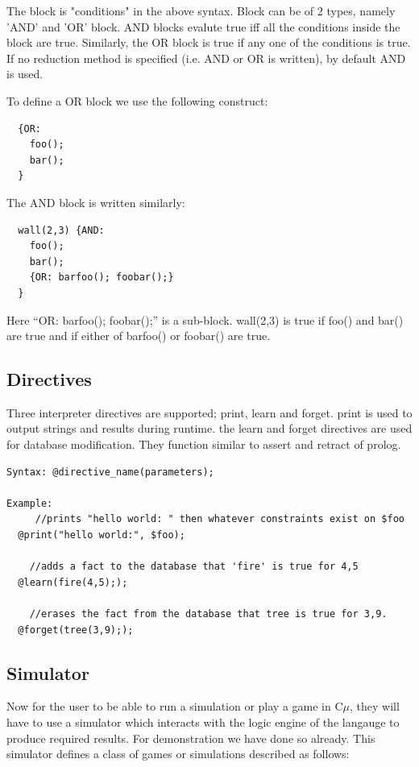 \documentclass[onecolumn,titlepage]{article}
\begin{document}
The block is "{conditions}" in the above syntax. Block can be of 2
types, namely 'AND' and 'OR' block. AND blocks evalute true iff all
the conditions inside the block are true. Similarly, the OR block is
true if any one of the conditions is true. If no reduction method is
specified (i.e. AND or OR is written), by default AND is used.

To define a OR block we use the following construct:

\begin{verbatim}
  {OR:
    foo();
    bar();
  }
\end{verbatim}

The AND block is written similarly:

\begin{verbatim}
  wall(2,3) {AND:
    foo();
    bar();
    {OR: barfoo(); foobar();}
  }
\end{verbatim}

Here ``{OR: barfoo(); foobar();}'' is a sub-block. wall(2,3) is
true if foo() and bar() are true and if either of barfoo() or foobar()
are true.

\subsection{Directives}
Three interpreter directives are supported; print, learn and
forget. print is used to output strings and results during
runtime. the learn and forget directives are used for database
modification. They function similar to assert and retract of prolog.

\begin{verbatim}
Syntax: @directive_name(parameters);

Example:
     //prints "hello world: " then whatever constraints exist on $foo
  @print("hello world:", $foo);

    //adds a fact to the database that 'fire' is true for 4,5
  @learn(fire(4,5););

    //erases the fact from the database that tree is true for 3,9.
  @forget(tree(3,9););
\end{verbatim}

\subsection{Simulator}

Now for the user to be able to run a simulation or play a game in
C$\mu$, they will have to use a simulator which interacts with the
logic engine of the langauge to produce required results. For
demonstration we have done so already. This simulator defines a class
of games or simulations described as follows:
\end{document}
